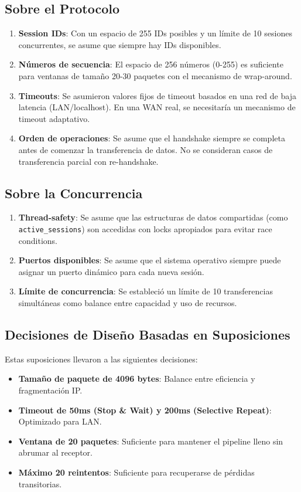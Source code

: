 \subsection{Sobre el Protocolo}
\begin{enumerate}
    \item \textbf{Session IDs}: Con un espacio de 255 IDs posibles y un límite de 10 sesiones concurrentes, se asume que siempre hay IDs disponibles.
    \item \textbf{Números de secuencia}: El espacio de 256 números (0-255) es suficiente para ventanas de tamaño 20-30 paquetes con el mecanismo de wrap-around.
    \item \textbf{Timeouts}: Se asumieron valores fijos de timeout basados en una red de baja latencia (LAN/localhost). En una WAN real, se necesitaría un mecanismo de timeout adaptativo.
    \item \textbf{Orden de operaciones}: Se asume que el handshake siempre se completa antes de comenzar la transferencia de datos. No se consideran casos de transferencia parcial con re-handshake.
\end{enumerate}

\subsection{Sobre la Concurrencia}
\begin{enumerate}
    \item \textbf{Thread-safety}: Se asume que las estructuras de datos compartidas (como \texttt{active\_sessions}) son accedidas con locks apropiados para evitar race conditions.
    \item \textbf{Puertos disponibles}: Se asume que el sistema operativo siempre puede asignar un puerto dinámico para cada nueva sesión.
    \item \textbf{Límite de concurrencia}: Se estableció un límite de 10 transferencias simultáneas como balance entre capacidad y uso de recursos.
\end{enumerate}

\subsection{Decisiones de Diseño Basadas en Suposiciones}
Estas suposiciones llevaron a las siguientes decisiones:
\begin{itemize}
    \item \textbf{Tamaño de paquete de 4096 bytes}: Balance entre eficiencia y fragmentación IP.
    \item \textbf{Timeout de 50ms (Stop \& Wait) y 200ms (Selective Repeat)}: Optimizado para LAN.
    \item \textbf{Ventana de 20 paquetes}: Suficiente para mantener el pipeline lleno sin abrumar al receptor.
    \item \textbf{Máximo 20 reintentos}: Suficiente para recuperarse de pérdidas transitorias.
\end{itemize}
